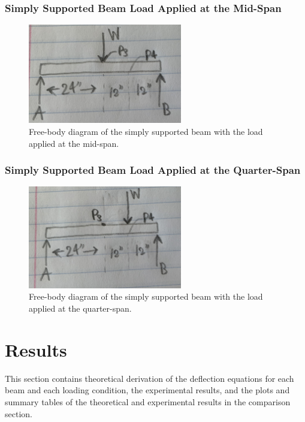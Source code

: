 \documentclass[12pt, titlepage]{article}
\begin{document}
\subsubsection{Simply Supported Beam Load Applied at the Mid-Span}
\begin{figure}[H]
    \centering
    \includegraphics[width=0.6\textwidth]{./Images/S_mid.jpg}
    \caption{Free-body diagram of the simply supported beam with the load
    applied at the mid-span.}
    \label{fig:SimplySupportedBeamMid}
\end{figure}
\subsubsection{Simply Supported Beam Load Applied at the Quarter-Span}
\begin{figure}[H]
    \centering
    \includegraphics[width=0.6\textwidth]{./Images/S_quarter.jpg}
    \caption{Free-body diagram of the simply supported beam with the load
    applied at the quarter-span.}
    \label{fig:SimplySupportedBeamQuarter}
\end{figure}
\newpage
\section{Results}
This section contains theoretical derivation of the deflection equations for
each beam and each loading condition, the experimental results, and the
plots and summary tables of the theoretical and experimental results in the
comparison section.
\end{document}
